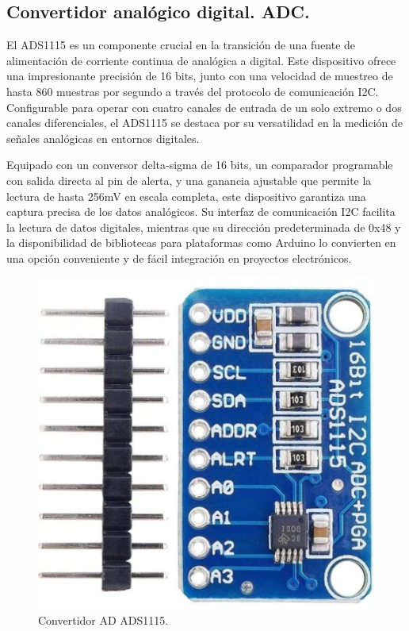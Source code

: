 \subsection{Convertidor analógico digital. ADC.}
El ADS1115 es un componente crucial en la transición de una fuente de alimentación de corriente continua de analógica a digital. Este dispositivo ofrece una impresionante precisión de 16 bits, junto con una velocidad de muestreo de hasta 860 muestras por segundo a través del protocolo de comunicación I2C. Configurable para operar con cuatro canales de entrada de un solo extremo o dos canales diferenciales, el ADS1115 se destaca por su versatilidad en la medición de señales analógicas en entornos digitales. \par 
Equipado con un conversor delta-sigma de 16 bits, un comparador programable con salida directa al pin de alerta, y una ganancia ajustable que permite la lectura de hasta 256mV en escala completa, este dispositivo garantiza una captura precisa de los datos analógicos. Su interfaz de comunicación I2C facilita la lectura de datos digitales, mientras que su dirección predeterminada de 0x48 y la disponibilidad de bibliotecas para plataformas como Arduino lo convierten en una opción conveniente y de fácil integración en proyectos electrónicos.
\begin{figure}[H]
    \centering
    \includegraphics[scale=0.3]{./imagenes/ads1115.jpg}
    \caption{Convertidor AD ADS1115.}
    \label{F:ADC}
\end{figure}

